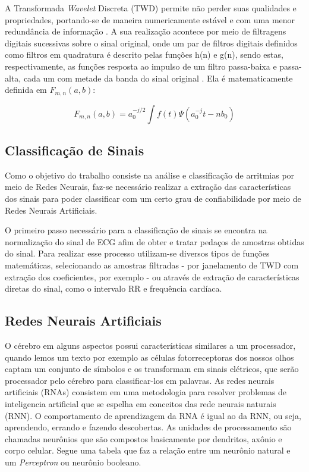 \documentclass[conference]{IEEEtran}
\begin{document}
A Transformada \textit{Wavelet} Discreta (TWD) permite não perder suas qualidades e propriedades, portando-se de maneira numericamente estável e com uma menor redundância de informação \cite{silva06}. A sua realização acontece por meio de filtragens digitais sucessivas sobre o sinal
original, onde um par de filtros digitais definidos como filtros em quadratura é descrito pelas funções h(n) e g(n), sendo estas, respectivamente, as funções resposta ao impulso de um filtro passa-baixa e passa-alta, cada um com metade da banda do sinal original \cite{castelano06}. Ela é matematicamente definida em $F_{m,n}(a,b)$:

\[ 	F_{m,n}(a,b) = a_{0}^{-j/2}\int f(t)\Psi (a_{0}^{-j}t - nb_{0}) \]

\subsection{Classificação de Sinais}
Como o objetivo do trabalho consiste na análise e classificação de arritmias por meio de Redes Neurais, faz-se necessário realizar a extração das características dos sinais para poder classificar com um certo grau de confiabilidade por meio de Redes Neurais Artificiais.

O primeiro passo necessário para a classificação de sinais se encontra na normalização do sinal de ECG afim de obter e tratar pedaços de amostras obtidas do sinal. Para realizar esse processo utilizam-se diversos tipos de funções matemáticas, selecionando as amostras filtradas - por janelamento de TWD com extração dos coeficientes, por exemplo - ou através de extração de características diretas do sinal, como o intervalo RR e frequência cardíaca.

\subsection{Redes Neurais Artificiais}

O cérebro em alguns aspectos possui características similares a um processador, quando lemos um texto por exemplo as células fotorreceptoras dos nossos olhos captam um conjunto de símbolos e os transformam em sinais elétricos, que serão processador pelo cérebro para classificar-los em palavras. As redes neurais artificiais (RNAs) consistem em uma metodologia para resolver problemas de inteligencia artificial que se espelha em conceitos das rede neurais naturais (RNN). O comportamento de aprendizagem da RNA é igual ao da RNN, ou seja, aprendendo, errando e fazendo descobertas. As unidades de processamento são chamadas neurônios que são compostos basicamente por dendritos, axônio e corpo celular. Segue uma tabela que faz a relação entre um neurônio natural e um \textit{Perceptron} ou neurônio booleano.
\end{document}
